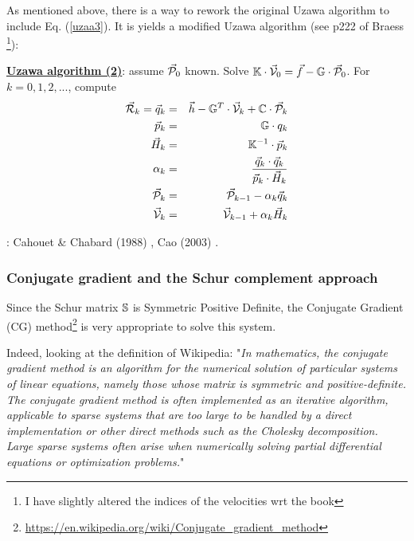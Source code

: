 As mentioned above, there is a way to rework the original Uzawa algorithm 
to include Eq. (\ref{uzaa3}). It is yields a modified 
Uzawa algorithm (see p222 of Braess \cite{braess}
\footnote{I have slightly 
altered the indices of the velocities wrt the book}):


\begin{mdframed}[backgroundcolor=blue!5]
\underline{\bf Uzawa algorithm (2)}: assume $\vec{\cal P}_0$ known. 
Solve $\mathbb{K}\cdot \vec{\cal V}_0 = \vec f - \mathbb{G}\cdot  \vec{\cal P}_0$. 
For $k=0,1,2,...$, compute 
\begin{eqnarray}
\vec{\cal R}_k=\vec q_k &=& \vec h-\mathbb{G}^T \cdot \vec{\cal V}_k + {\mathbb{C}} \cdot \vec{\cal P}_{k}\\
\vec{p}_k &=& {{\mathbb{G}}}\cdot q_k \\
\vec H_k &=& {{\mathbb{K}}}^{-1}\cdot \vec{p}_k \\
\alpha_k &=& \frac{\vec q_k \cdot \vec q_k}{\vec{p}_k \cdot \vec H_k} \\
\vec {\cal P}_k &=& \vec {\cal P}_{k-1} - \alpha_k  \vec q_k \\
\vec {\cal V}_{k} &=& \vec {\cal V}_{k-1} + \alpha_k  \vec H_k
\end{eqnarray}
\end{mdframed}


\Literature: Cahouet \& Chabard (1988) \cite{cach88}, Cao (2003) \cite{cao03}.





\subsubsection{Conjugate gradient and the Schur complement approach }
\label{ss:schurpcg}

 
Since the Schur matrix ${\mathbb{S}}$ is Symmetric Positive Definite, 
the Conjugate Gradient (CG) method\footnote{\url{https://en.wikipedia.org/wiki/Conjugate_gradient_method}} \cite{hest52} 
is very appropriate to solve this system. 

Indeed, looking at the definition of Wikipedia: "{\it In mathematics, the conjugate gradient method is an algorithm 
for the numerical solution of particular systems of linear equations, namely those whose matrix is symmetric and positive-definite. 
The conjugate gradient method is often implemented as an iterative algorithm, applicable to sparse systems that are too large 
to be handled by a direct implementation or other direct methods such as the Cholesky decomposition. 
Large sparse systems often arise when numerically solving partial differential equations or optimization problems.}"

